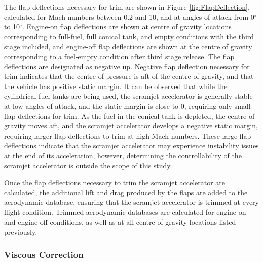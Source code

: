 		The flap deflections necessary for trim are shown in Figure \ref{fig:FlapDeflection}, calculated for Mach numbers between 0.2 and 10, and at angles of attack from 0$^\circ$ to 10$^\circ$. Engine-on flap deflections are shown at centre of gravity locations corresponding to full-fuel, full conical tank, and empty conditions with the third stage included, and engine-off flap deflections are shown at the centre of gravity corresponding to a fuel-empty condition after third stage release. 
		The flap deflections are designated as negative up. Negative flap deflection necessary for trim indicates that the centre of pressure is aft of the centre of gravity, and that the vehicle has positive static margin.
		It can be observed that while the cylindrical fuel tanks are being used, the scramjet accelerator is generally stable at low angles of attack, and the static margin is close to 0, requiring only small flap deflections for trim. As the fuel in the conical tank is depleted, the centre of gravity moves aft, and the scramjet accelerator develops a negative static margin, requiring larger flap deflections to trim at high Mach numbers. These large flap deflections indicate that the scramjet accelerator may experience instability issues at the end of its acceleration, however, determining the controllability of the scramjet accelerator is outside the scope of this study. 
		
		  Once the flap deflections necessary to trim the scramjet accelerator are calculated, the additional lift and drag produced by the flaps are added to the aerodynamic database, ensuring that the scramjet accelerator is trimmed at every flight condition.
		  Trimmed aerodynamic databases are calculated for engine on and engine off conditions, as well as at all centre of gravity locations listed previously. 
		
		
		
		\subsubsection{Viscous Correction}
		
